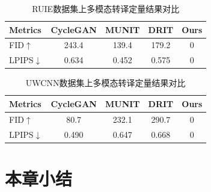 \begin{table}[htb]
  \centering\small
  \caption{RUIE数据集上多模态转译定量结果对比}
  \label{tab:ruie_metric}
  \begin{tabular}{l|cccc}
    \toprule
    Metrics & CycleGAN & MUNIT & DRIT & Ours               \\
    \midrule
    FID$\uparrow$     & 243.4 & 139.4 & 179.2 & 0 \\ %
    LPIPS$\downarrow$ & 0.634 & 0.452 & 0.575 & 0 \\
    \bottomrule
  \end{tabular}
\end{table}

\begin{table}[htb]
  \centering\small
  
  \caption{UWCNN数据集上多模态转译定量结果对比}
  \label{tab:uwcnn_metric}
  \begin{tabular}{l|cccc}
    \toprule
    Metrics & CycleGAN & MUNIT & DRIT & Ours               \\
    \midrule
    FID$\uparrow$     & 80.7  & 232.1 & 290.7 & 0 \\ %
    LPIPS$\downarrow$ & 0.490 & 0.647 & 0.668 & 0 \\
    \bottomrule
  \end{tabular}
\end{table}


\section{本章小结}
